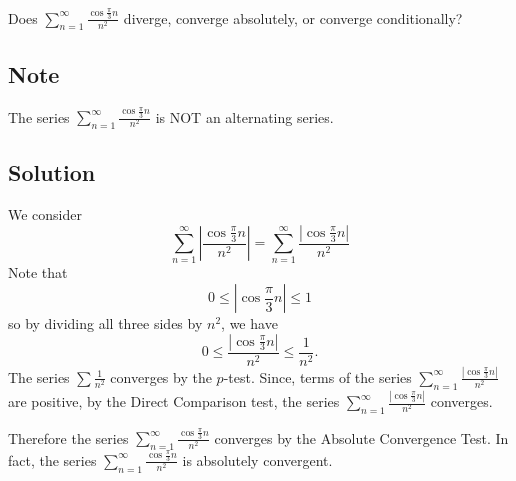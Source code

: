 \documentclass{article}
\begin{document}
\noindent
Does $\displaystyle \sum_{n=1}^\infty \frac{\cos \frac\pi3 n}{n^2}$
diverge, converge absolutely, or converge conditionally?

\subsection*{Note}

The series $\displaystyle \sum_{n=1}^\infty \frac{\cos \frac\pi3 n}{n^2}$ is NOT an alternating series.

\subsection*{Solution}

We consider 
\[
\sum_{n=1}^\infty \left|\frac{\cos \frac\pi3 n}{n^2}\right|
= \sum_{n=1}^\infty \frac{|\cos \frac\pi3 n|}{n^2}
\]
Note that 
\[ 0 \leq  |\cos \frac\pi3 n| \leq 1\]
so by dividing all three sides by $n^2$, we have
\[ 0 \leq  \frac{|\cos \frac\pi3 n|}{n^2} \leq \frac1{n^2}.\]
The series $\displaystyle \sum \frac1{n^2}$ converges by the $p$-test. Since, terms of the series $\displaystyle \sum_{n=1}^\infty \frac{|\cos \frac\pi3 n|}{n^2}$ are positive, by the Direct Comparison test, the series $\displaystyle \sum_{n=1}^\infty \frac{|\cos \frac\pi3 n|}{n^2}$ converges.

Therefore the series $\displaystyle \sum_{n=1}^\infty \frac{\cos \frac\pi3 n}{n^2}$ converges by the Absolute Convergence Test. In fact, the series $\displaystyle \sum_{n=1}^\infty \frac{\cos \frac\pi3 n}{n^2}$ is absolutely convergent.
\end{document}
